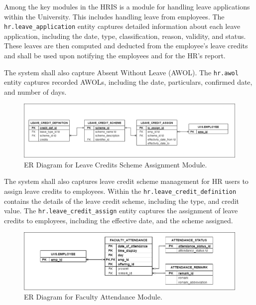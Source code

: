     Among the key modules in the HRIS is a module for handling leave applications within the University. This includes handling leave from employees. The \texttt{hr.leave\_application} entity captures detailed information about each leave application, including the date, type, classification, reason, validity, and status. These leaves are then computed and deducted from the employee's leave credits and shall be used upon notifying the employees and for the HR's report.

    The system shall also capture Absent Without Leave (AWOL). The \texttt{hr.awol} entity captures recorded AWOLs, including the date, particulars, confirmed date, and number of days.

    \begin{figure}[H]
        \centering
        \includegraphics[width=1\linewidth]{figures/images/diagrams/erd/erd-leavesys-leave-credit-scheme.png}
        \caption{ER Diagram for Leave Credits Scheme Assignment Module.}
        \label{fig:erd-leavesys-leave-credit-scheme}
    \end{figure}

    The system shall also captures leave credit scheme management for HR users to assign leave credits to employees. Within the \texttt{hr.leave\_credit\_definition} contains the details of the leave credit scheme, including the type, and credit value. The \texttt{hr.leave\_credit\_assign} entity captures the assignment of leave credits to employees, including the effective date, and the scheme assigned.

    \begin{figure}[H]
        \centering
        \includegraphics[width=1\linewidth]{figures/images/diagrams/erd/erd-facsys-faculty-attendance.png}
        \caption{ER Diagram for Faculty Attendance Module.}
        \label{fig:erd-facsys-faculty-attendance}
    \end{figure}

